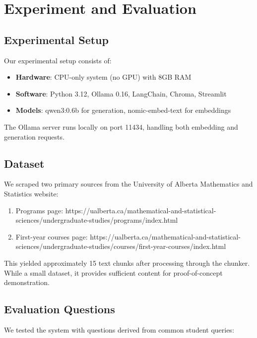 \documentclass[conference]{IEEEtran}
\begin{document}
\section{Experiment and Evaluation}
\label{sec:evaluation}

\subsection{Experimental Setup}
Our experimental setup consists of:

\begin{itemize}
    \item \textbf{Hardware}: CPU-only system (no GPU) with 8GB RAM
    \item \textbf{Software}: Python 3.12, Ollama 0.16, LangChain, Chroma, Streamlit
    \item \textbf{Models}: qwen3:0.6b for generation, nomic-embed-text for embeddings
\end{itemize}

The Ollama server runs locally on port 11434, handling both embedding and generation requests.

\subsection{Dataset}
We scraped two primary sources from the University of Alberta Mathematics and Statistics website:

\begin{enumerate}
    \item Programs page: https://ualberta.ca/mathematical-and-statistical-sciences/undergraduate-studies/programs/index.html
    \item First-year courses page: https://ualberta.ca/mathematical-and-statistical-sciences/undergraduate-studies/courses/first-year-courses/index.html
\end{enumerate}

This yielded approximately 15 text chunks after processing through the chunker. While a small dataset, it provides sufficient content for proof-of-concept demonstration.

\subsection{Evaluation Questions}
We tested the system with questions derived from common student queries:
\end{document}
